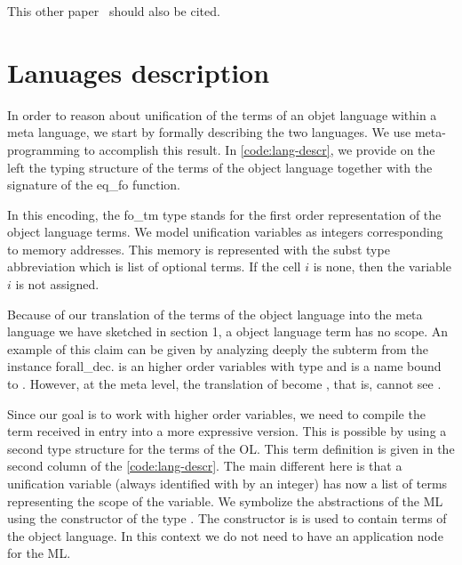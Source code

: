 \documentclass[sigconf,natbib=false]{acmart}
\begin{document}
This other paper~\cite{10.1007/978-3-031-38499-8_25} should also be cited.

\section{Lanuages description}




\def\eqfo{eq\_fo\xspace}

In order to reason about unification of the terms of an objet language within a
meta language, we start by formally describing the two languages. We use
meta-programming to accomplish this result. In \cref{code:lang-descr}, we
provide on the left the typing structure of the terms of the object language
together with the signature of the \eqfo function.

In this encoding, the fo\_tm type stands for the first order representation of
the object language terms. We model unification variables as integers
corresponding to memory addresses. This memory is represented with the subst
type abbreviation which is list of optional terms. If the cell $i$ is none, then
the variable $i$ is not assigned. 

Because of our translation of the terms of the object language into the meta
language we have sketched in section 1, a object language term has no scope.
An example of this claim can be given by analyzing deeply the subterm  from
the instance forall\_dec.  is an higher order variables
with type  and
 is a name bound to .
However, at the meta level, the translation of  become , that is,  cannot see .

Since our goal is to work with higher order variables, we need to compile the
term received in entry into a more expressive version. This is possible by using
a second type structure for the terms of the OL. This term definition is given
in the second column of the \cref{code:lang-descr}. The main different here is
that a unification variable (always identified with by an integer) has now a
list of terms representing the scope of the variable. We symbolize the
abstractions of the ML using the constructor  of the type
. The constructor  is is used to contain terms of the
object language. In this context we do not need to have an application node for
the ML. 
\end{document}
